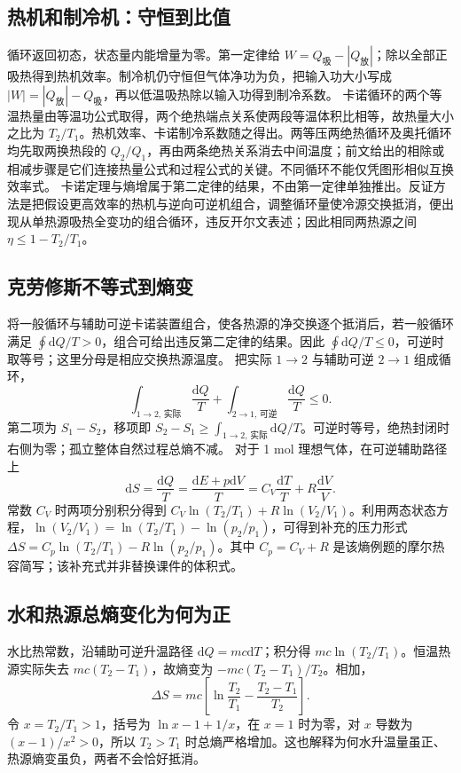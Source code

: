 \documentclass[UTF8,fontset=none,zihao=-4,a4paper]{ctexart}
\begin{document}
\subsection{热机和制冷机：守恒到比值}
循环返回初态，状态量内能增量为零。第一定律给 $W=Q_{\text{吸}}-|Q_{\text{放}}|$；除以全部正吸热得到热机效率。制冷机仍守恒但气体净功为负，把输入功大小写成 $|W|=|Q_{\text{放}}|-Q_{\text{吸}}$，再以低温吸热除以输入功得到制冷系数。
卡诺循环的两个等温热量由等温功公式取得，两个绝热端点关系使两段等温体积比相等，故热量大小之比为 $T_2/T_1$。热机效率、卡诺制冷系数随之得出。两等压两绝热循环及奥托循环均先取两换热段的 $Q_2/Q_1$，再由两条绝热关系消去中间温度；前文给出的相除或相减步骤是它们连接热量公式和过程公式的关键。不同循环不能仅凭图形相似互换效率式。
卡诺定理与熵增属于第二定律的结果，不由第一定律单独推出。反证方法是把假设更高效率的热机与逆向可逆机组合，调整循环量使冷源交换抵消，便出现从单热源吸热全变功的组合循环，违反开尔文表述；因此相同两热源之间 $\eta\le1-T_2/T_1$。

\subsection{克劳修斯不等式到熵变}
将一般循环与辅助可逆卡诺装置组合，使各热源的净交换逐个抵消后，若一般循环满足 $\oint\mathrm dQ/T>0$，组合可给出违反第二定律的结果。因此 $\oint\mathrm dQ/T\le0$，可逆时取等号；这里分母是相应交换热源温度。
把实际 $1\to2$ 与辅助可逆 $2\to1$ 组成循环，
\[
\int_{1\to2,\,\text{实际}}\frac{\mathrm dQ}T+\int_{2\to1,\,\text{可逆}}\frac{\mathrm dQ}T\le0.
\]
第二项为 $S_1-S_2$，移项即 $S_2-S_1\ge\int_{1\to2,\,\text{实际}}\mathrm dQ/T$。可逆时等号，绝热封闭时右侧为零；孤立整体自然过程总熵不减。
对于 1 mol 理想气体，在可逆辅助路径上
\[
\mathrm dS=\frac{\mathrm dQ}T=\frac{\mathrm dE+p\mathrm dV}T=C_V\frac{\mathrm dT}T+R\frac{\mathrm dV}V.
\]
常数 $C_V$ 时两项分别积分得到 $C_V\ln(T_2/T_1)+R\ln(V_2/V_1)$。利用两态状态方程，$\ln(V_2/V_1)=\ln(T_2/T_1)-\ln(p_2/p_1)$，可得到补充的压力形式 $\Delta S=C_p\ln(T_2/T_1)-R\ln(p_2/p_1)$。其中 $C_p=C_V+R$ 是该熵例题的摩尔热容简写；该补充式并非替换课件的体积式。

\subsection{水和热源总熵变化为何为正}
水比热常数，沿辅助可逆升温路径 $\mathrm dQ=mc\mathrm dT$；积分得 $mc\ln(T_2/T_1)$。恒温热源实际失去 $mc(T_2-T_1)$，故熵变为 $-mc(T_2-T_1)/T_2$。相加，
\[
\Delta S=mc\left[\ln\frac{T_2}{T_1}-\frac{T_2-T_1}{T_2}\right].
\]
令 $x=T_2/T_1>1$，括号为 $\ln x-1+1/x$，在 $x=1$ 时为零，对 $x$ 导数为 $(x-1)/x^2>0$，所以 $T_2>T_1$ 时总熵严格增加。这也解释为何水升温量虽正、热源熵变虽负，两者不会恰好抵消。
\end{document}
